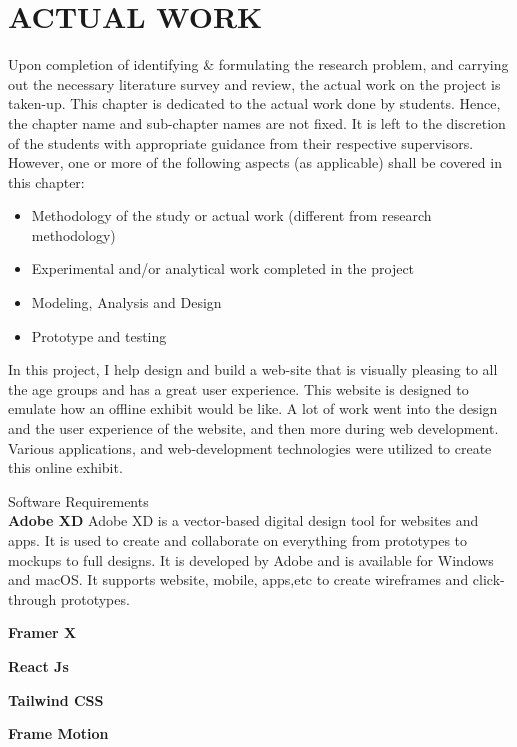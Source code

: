 \chapter{ACTUAL WORK} %
\label{ChapterActualWork} %


Upon completion of identifying \& formulating the research problem, and carrying out the necessary literature survey and review, the actual work on the project is taken-up. This chapter is dedicated to the actual work done by students. Hence, the chapter name and sub-chapter names are not fixed. It is left to the discretion of the students with appropriate guidance from their respective supervisors. However, one or more of the following aspects (as applicable) shall be covered in this chapter:
\begin{itemize}
	\item Methodology of the study or actual work (different from research methodology)
	\item Experimental and/or analytical work completed in the project
	\item Modeling, Analysis and Design
	\item Prototype and testing
\end{itemize}

In this project, I help design and build a web-site that is visually pleasing to all the age groups and has a great user experience. This website is designed to emulate how an offline exhibit would be like. A lot of work went into the design and the user experience of the website, and then more during web development. Various applications, and web-development technologies were utilized to create this online exhibit. 


Software Requirements
\\
\textbf{Adobe XD}
Adobe XD is a vector-based digital design tool for websites and apps. It is used to  create and collaborate on everything from prototypes to mockups to full designs. It is developed by Adobe and is available for Windows and macOS. It supports website, mobile, apps,etc to create wireframes and click-through prototypes.


\textbf{Framer X}

\textbf{React Js}

\textbf{Tailwind CSS}

\textbf{ Frame Motion }

